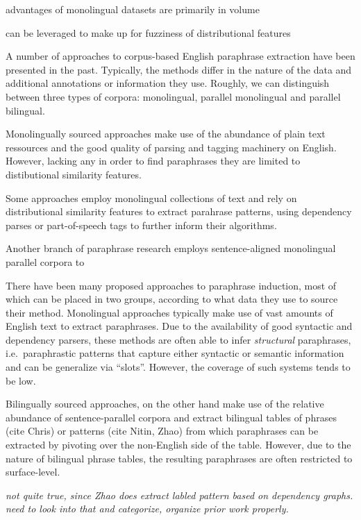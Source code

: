 \documentclass[11pt]{article}
\begin{document}
advantages of monolingual datasets are primarily in volume

can be leveraged to make up for fuzziness of distributional features




A number of approaches to corpus-based English paraphrase extraction
have been presented in the past. Typically, the methods differ in the
nature of the data and additional annotations or information they
use. Roughly, we can distinguish between three types of corpora:
monolingual, parallel monolingual and parallel bilingual.

Monolingually sourced approaches make use of the abundance of plain
text ressources and the good quality of parsing and tagging machinery
on English. However, lacking any in order to find paraphrases they are
limited to distibutional similarity features.

Some approaches employ monolingual collections of text and rely on
distributional similarity features to extract parahrase patterns,
using dependency parses \cite{Lin2001} or part-of-speech tags
\cite{Bhagat2008} to further inform their algorithms.

Another branch of paraphrase research employs sentence-aligned
monolingual parallel corpora \cite{Barzilay2001,Quirk2004} to

There have been many proposed approaches to paraphrase induction, most
of which can be placed in two groups, according to what data they use
to source their method. Monolingual approaches typically make use of
vast amounts of English text to extract paraphrases. Due to the
availability of good syntactic and dependency parsers, these methods
are often able to infer \emph{structural} paraphrases, i.e.\
paraphrastic patterns that capture either syntactic or semantic
information and can be generalize via ``slots''. However, the coverage
of such systems tends to be low.

Bilingually sourced approaches, on the other hand make use of the
relative abundance of sentence-parallel corpora and extract bilingual
tables of phrases (cite Chris) or patterns (cite Nitin, Zhao) from
which paraphrases can be extracted by pivoting over the non-English
side of the table. However, due to the nature of bilingual phrase
tables, the resulting paraphrases are often restricted to
surface-level.

\emph{not quite true, since Zhao does extract labled pattern based on
  dependency graphs. need to look into that and categorize, organize
  prior work properly.}
\end{document}
